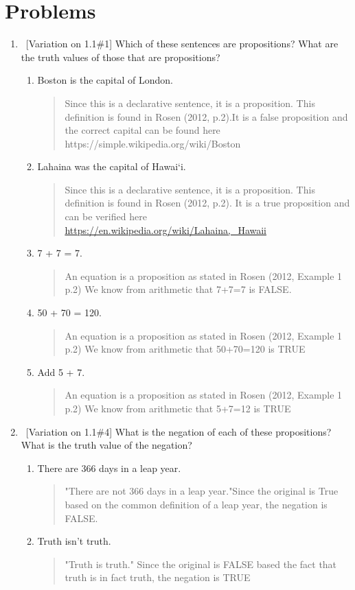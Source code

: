 \documentclass[10pt]{article}
\newcommand{\Answer}[1]{\begin{quote}{\color{blue}#1}\end{quote}}
\begin{document}
\section*{Problems}
\begin{enumerate}
\item \ [Variation on 1.1\#1] Which of these sentences are propositions? What are the
truth values of those that are propositions?
\begin{enumerate}
\item Boston is the capital of London. \qquad [5 points]
\Answer{Since this is a declarative sentence, it is a proposition. This definition is found in Rosen (2012, p.2).It is a false proposition and the correct capital can be found here https://simple.wikipedia.org/wiki/Boston }

\item Lahaina was the capital of Hawai`i.\qquad [5 points]
\Answer{Since this is a declarative sentence, it is a proposition. This definition is found in Rosen (2012, p.2). It is a true proposition and can be verified here \url{https://en.wikipedia.org/wiki/Lahaina,_Hawaii}}
\item 7 + 7 = 7.\qquad [5 points]
\Answer{An equation is a proposition as stated in Rosen (2012, Example 1 p.2) We know from arithmetic that 7+7=7 is FALSE.}

\item 50 + 70 = 120.\qquad [5 points]
\Answer{An equation is a proposition as stated in Rosen (2012, Example 1 p.2) We know from arithmetic that 50+70=120 is TRUE}

\item Add 5 + 7. \qquad [5 points]
\Answer{An equation is a proposition as stated in Rosen (2012, Example 1 p.2) We know from arithmetic that 5+7=12 is TRUE}

\end{enumerate}

\item \ [Variation on 1.1\#4] What is the negation of each of these propositions?  What is the truth value of the negation?
\begin{enumerate}
\item There are 366 days in a leap year. \qquad [5 points]
\Answer{"There are not 366 days in a leap year."Since the original is True based on the common definition of a leap year, the negation is FALSE.}

\item Truth isn't truth. \qquad [5 points]
\Answer{"Truth is truth." Since the original is FALSE based the fact that truth is in fact truth, the negation is TRUE}


\end{enumerate}
\end{enumerate}
\end{document}
